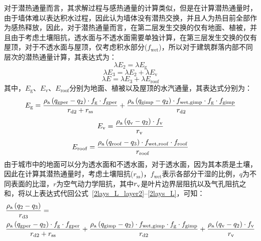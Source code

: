 对于潜热通量而言，其求解过程与感热通量的计算类似，但是在计算潜热通量时，由于墙体难以表达积水过程，因此认为墙体没有潜热交换，并且人为热目前全部作为感热释放，因此，对于潜热通量而言，在第二层发生交换的仅有地面、植被，并且由于考虑土壤阻抗，透水面与不透水面需要单独计算，在第三层发生交换的仅有屋顶，对于不透水面与屋顶，仅考虑积水部分($f_{\mathrm{wet}}$)，所以对于建筑群落内部不同层次的潜热通量计算，其表达式为：
\begin{equation}\label{2lays_L_layer2}
  \lambda E_{\mathrm{2}} = \lambda E_{\mathrm{g}}
\end{equation}
%
\begin{equation}
  \lambda E_{3} = \lambda E_{2} + \lambda E_{\mathrm{v}}
\end{equation}
%
\begin{equation}\label{2lays_L}
  \lambda E = \lambda E_{3} + \lambda E_{\mathrm{roof}}
\end{equation}
其中，$ E_{\mathrm{g}}$、$ E_{\mathrm{v}}$、$ E_{\mathrm{roof}}$分别为地面、植被以及屋顶的水汽通量，其表达式分别为：
\begin{equation}\label{urban_Eg}
  E_{\mathrm{g}} = \frac{\rho _{\rm a} \left( q_{\mathrm{gper}}-q_{2} \right) \cdot f_{\mathrm{g}} \cdot f_{\mathrm{gper}}}{r_{\mathrm{d2}}+r_{\mathrm{ss}}} + \frac{\rho _{\rm a} \left( q_{\mathrm{gimp}}-q_{2} \right) \cdot f_{\mathrm{wet,gimp}} \cdot f_{\mathrm{g}} \cdot f_{\mathrm{gimp}}}{r_{\mathrm{d2}}}
\end{equation}
%
\begin{equation}
  E_{\mathrm{v}} = \frac{\rho _{\rm a} \left( q_{\mathrm{v}}-q_{2}\right) \cdot f_{\rm v}}{r_{\mathrm{v}}}
\end{equation}
%
\begin{equation}\label{urban_Eroof}
  E_{\mathrm{roof}} = \frac{\rho _{\rm a} \left( q_{\mathrm{roof}}-q_{3}\right) \cdot f_{\mathrm{wet,roof}} \cdot f_{\mathrm{roof}}}{r_{\mathrm{roof}}}
\end{equation}
由于城市中的地面可以分为透水面和不透水面，对于透水面，因为其本质是土壤，因此在计算其潜热通量时，考虑土壤阻抗($r_{\mathrm{ss}}$)，$f_{\mathrm{wet}}$表示各部分干湿的比例，$q$为不同表面的比湿，$r$为空气动力学阻抗，其中$r_{\rm v}$是叶片边界层阻抗以及气孔阻抗之和，将以上表达式代回公式~\eqref{2lays_L_layer2}--\eqref{2lays_L}，可知：
\begin{equation}
  \begin{split}
    & \frac{\rho _{\rm a} \left( q_{2}-q_{3}\right)}{r_{\mathrm{d3}}} = \\
    & \frac{\rho _{\rm a} \left( q_{\mathrm{gper}}-q_{\mathrm{2}}\right) \cdot f_{\mathrm{g}} \cdot f_{\mathrm{gper}}}{r_{\mathrm{d2}}+r_{\mathrm{ss}}} + \frac{\rho _{\rm a} \left( q_{\mathrm{gimp}}-q_{2} \right) \cdot f_{\mathrm{wet,gimp}} \cdot f_{\mathrm{g}} \cdot f_{\mathrm{gimp}}}{r_{\mathrm{d2}}} + \frac{\rho _{\rm a} \left( q_{\mathrm{v}}-q_{2}\right) \cdot f_{\rm v}}{r_{\mathrm{v}}}
  \end{split}
\end{equation}
